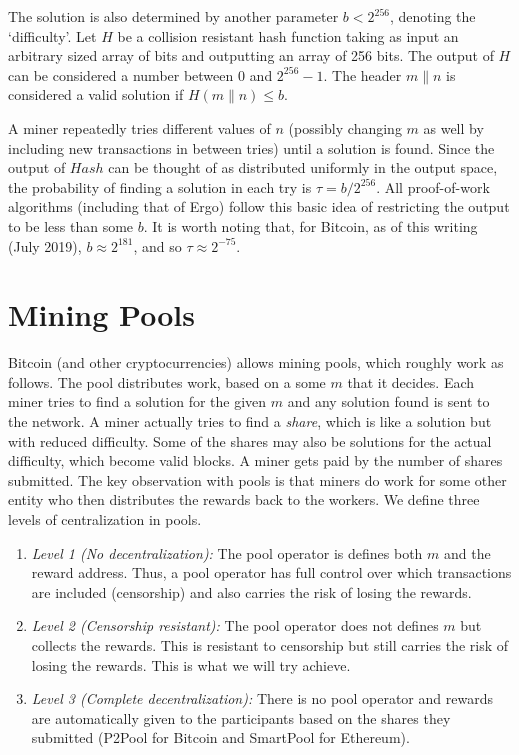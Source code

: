 \documentclass[11pt]{article}
\begin{document}
The solution is also determined by another parameter $b < 2^{256}$, denoting the `difficulty'. Let $H$ be a collision resistant hash function taking as input an arbitrary sized array of bits and outputting an array of 256 bits. The output of $H$ can be considered a number between 0 and $2^{256}-1$. The header $m\|n$ is considered a valid solution if $H(m\|n) \leq b$. 

A miner repeatedly tries different values of $n$ (possibly changing $m$ as well by including new transactions in between tries) until a solution is found. Since the output of $Hash$ can be thought of as distributed uniformly in the output space, the probability of finding a solution in each try is $\tau = b/2^{256}$. All proof-of-work algorithms (including that of Ergo) follow this basic idea of restricting the output to be less than some $b$. It is worth noting that, for Bitcoin, as of this writing (July 2019), $b\approx 2^{181}$, and so $\tau \approx 2^{-75}$. %

\section{Mining Pools}

Bitcoin (and other cryptocurrencies) allows mining pools, which roughly work as follows. The pool distributes work, based on a some $m$ that it decides. Each miner tries to find a solution for the given $m$ and any solution found is sent to the network. 
A miner actually tries to find a {\em share}, which is like a solution but with reduced difficulty. Some of the shares may also be solutions for the actual difficulty, which become valid blocks. A miner gets paid by the number of shares submitted.
The key observation with pools is that miners do work for some other entity who then distributes the rewards back to the workers.
We define three levels of centralization in pools. 

\begin{enumerate}
	\item {\em Level 1 (No decentralization):} The pool operator is defines both $m$ and the reward address. Thus, a pool operator has full control over which transactions are included (censorship) and also carries the risk of losing the rewards.
	\item {\em Level 2 (Censorship resistant):} The pool operator does not defines $m$ but collects the rewards. This is resistant to censorship but still carries the risk of losing the rewards. This is what we will try achieve. 
	\item {\em Level 3 (Complete decentralization):} There is no pool operator and rewards are automatically given to the participants based on the shares they submitted (P2Pool for Bitcoin and SmartPool for Ethereum).
\end{enumerate}
\end{document}
